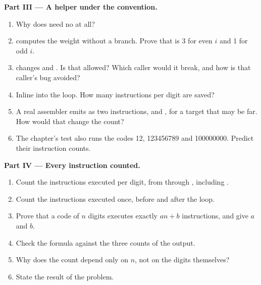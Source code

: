 \begin{problem}
\medskip\noindent\textbf{Part III --- A helper under the convention.}\par\nopagebreak
{}
\begin{enumerate}[resume, beginpenalty=10000]
\item Why does  need no  at all?
\item {} computes the weight without a branch. Prove that  is 3 for even $i$ and 1
for odd $i$.
\item {} changes  and . Is that allowed? Which caller would it break, and how is that
caller's bug avoided?
\item Inline  into the loop. How many instructions per digit are saved?
\item A real assembler emits  as two instructions,  and , for a target that may be far.
How would that change the count?
\item The chapter's test also runs the codes 12, 123456789 and 100000000. Predict their instruction counts.
\end{enumerate}

\medskip\noindent\textbf{Part IV --- Every instruction counted.}\par\nopagebreak
{}
\begin{enumerate}[resume, beginpenalty=10000]
\item Count the instructions executed per digit, from  through , including .
\item Count the instructions executed once, before and after the loop.
\item Prove that a code of $n$ digits executes exactly $an + b$ instructions, and give $a$ and $b$.
\item Check the formula against the three counts of the output.
\item Why does the count depend only on $n$, not on the digits themselves?
\item State the result of the problem.
\end{enumerate}
\end{problem}

